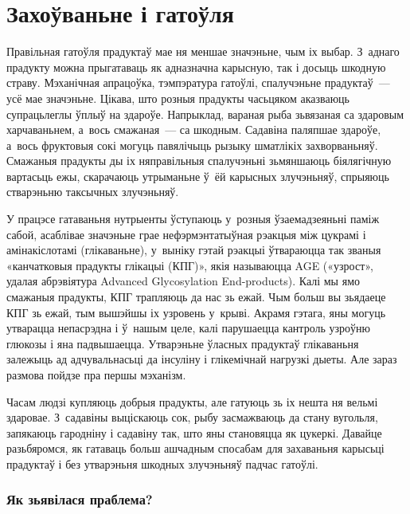 \chapter{Захоўваньне і гатоўля}

Правільная гатоўля прадуктаў мае ня меншае значэньне, чым іх выбар. З~аднаго прадукту можна прыгатаваць як адназначна карысную, так і досыць шкодную страву. Мэханічная апрацоўка, тэмпэратура гатоўлі, спалучэньне прадуктаў~--- усё мае значэньне. Цікава, што розныя прадукты часьцяком аказваюць супрацьлеглы ўплыў на здароўе. Напрыклад, вараная рыба зьвязаная са здаровым харчаваньнем, а~вось смажаная~--- са шкодным. Садавіна паляпшае здароўе, а~вось фруктовыя сокі могуць павялічыць рызыку шматлікіх захворваньняў. Смажаныя прадукты ды іх няправільныя спалучэньні зьмяншаюць біялягічную вартасьць ежы, скарачаюць утрыманьне ў~ёй карысных злучэньняў, спрыяюць стварэньню таксычных злучэньняў.


У працэсе гатаваньня нутрыенты ўступаюць у~розныя ўзаемадзеяньні паміж сабой, асаблівае значэньне грае нефэрмэнтатыўная рэакцыя між цукрамі і амінакіслотамі (глікаваньне), у~выніку гэтай рэакцыі ўтвараюцца так званыя «канчатковыя прадукты глікацыі (КПГ)», якія называюцца AGE («узрост», удалая абрэвіятура Advanced Glycosylation End-products). Калі мы ямо смажаныя прадукты, КПГ трапляюць да нас зь ежай. Чым больш вы зьядаеце КПГ зь ежай, тым вышэйшы іх узровень у~крыві. Акрамя гэтага, яны могуць утварацца непасрэдна і ў~нашым целе, калі парушаецца кантроль узроўню глюкозы і яна падвышаецца. Утварэньне ўласных прадуктаў глікаваньня залежыць ад адчувальнасьці да інсуліну і глікемічнай нагрузкі дыеты. Але зараз размова пойдзе пра першы мэханізм.

Часам людзі купляюць добрыя прадукты, але гатуюць зь іх нешта ня вельмі здаровае. З~садавіны выціскаюць сок, рыбу засмажваюць да стану вугольля, запякаюць гародніну і садавіну так, што яны становяцца як цукеркі. Давайце разьбяромся, як гатаваць больш ашчадным спосабам для захаваньня карысьці прадуктаў і без утварэньня шкодных злучэньняў падчас гатоўлі.

\subsection{Як зьявілася праблема?}

